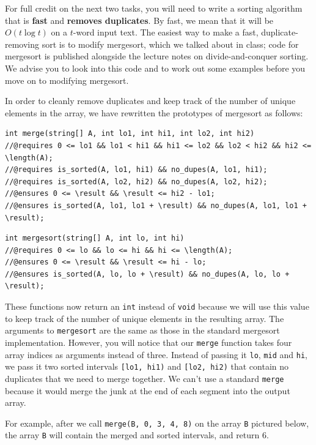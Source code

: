 \documentclass[12pt]{exam}
\begin{document}
For full credit on the next two tasks, you will need to write a
sorting algorithm that is \textbf{fast} and \textbf{removes
  duplicates}.  By fast, we mean that it will be $O(t \log t)$ on a
$t$-word input text.  The easiest way to make a fast,
duplicate-removing sort is to modify mergesort, which we talked about
in class; code for mergesort is published alongside the lecture notes
on divide-and-conquer sorting.  We advise you to look into this code
and to work out some examples before you move on to modifying
mergesort.

In order to cleanly remove duplicates and keep track of the number of
unique elements in the array, we have rewritten the prototypes of
mergesort as follows:

\begin{lstlisting}[basicstyle=\smallbasicstyle]
int merge(string[] A, int lo1, int hi1, int lo2, int hi2)
//@requires 0 <= lo1 && lo1 < hi1 && hi1 <= lo2 && lo2 < hi2 && hi2 <= \length(A);
//@requires is_sorted(A, lo1, hi1) && no_dupes(A, lo1, hi1);
//@requires is_sorted(A, lo2, hi2) && no_dupes(A, lo2, hi2);
//@ensures 0 <= \result && \result <= hi2 - lo1;
//@ensures is_sorted(A, lo1, lo1 + \result) && no_dupes(A, lo1, lo1 + \result);
\end{lstlisting}

\begin{lstlisting}[basicstyle=\smallbasicstyle]
int mergesort(string[] A, int lo, int hi)
//@requires 0 <= lo && lo <= hi && hi <= \length(A);
//@ensures 0 <= \result && \result <= hi - lo;
//@ensures is_sorted(A, lo, lo + \result) && no_dupes(A, lo, lo + \result);
\end{lstlisting}


These functions now return an \lstinline'int' instead of
\lstinline'void' because we will use this value to keep track of the
number of unique elements in the resulting array.  The arguments to
\lstinline'mergesort' are the same as those in the standard mergesort
implementation. However, you will notice that our \lstinline'merge'
function takes four array indices as arguments instead of
three.  Instead of passing it \lstinline'lo', \lstinline'mid' and
\lstinline'hi', we pass it two sorted intervals \lstinline'[lo1, hi1)'
and \lstinline'[lo2, hi2)' that contain no duplicates that we need to
merge together. We can't use a standard \lstinline'merge' because
it would merge the junk at the end of each segment into the output
array.

For example, after we call \lstinline'merge(B, 0, 3, 4, 8)' on the
array \lstinline'B' pictured below, the array \lstinline'B' will
contain the merged and sorted intervals, and return 6.
\end{document}
